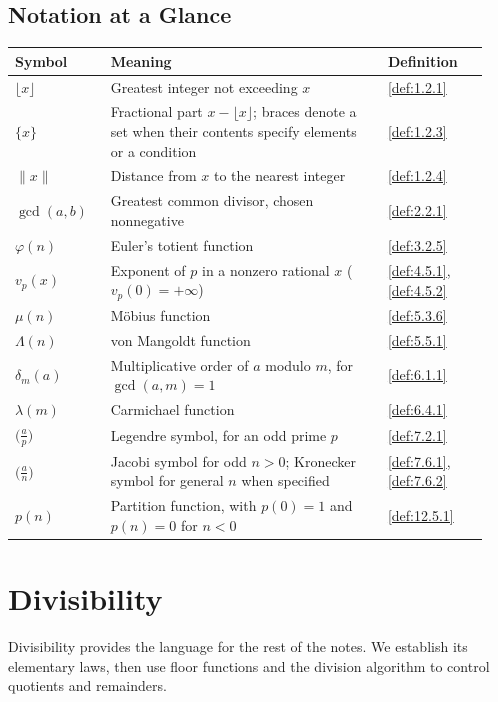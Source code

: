 \documentclass[11pt]{article}
\theoremstyle{ntstyle}
\newcommand{\legs}[2]{\bigl(\tfrac{#1}{#2}\bigr)}
\begin{document}
\subsection*{Notation at a Glance}
\begin{center}
\begin{tabular}{@{}p{0.19\linewidth}p{0.55\linewidth}p{0.20\linewidth}@{}}
\textbf{Symbol} & \textbf{Meaning} & \textbf{Definition} \\
\hline
$\lfloor x\rfloor$ & Greatest integer not exceeding $x$ & \ref{def:1.2.1} \\
$\{x\}$ & Fractional part $x-\lfloor x\rfloor$; braces denote a set when their contents specify elements or a condition & \ref{def:1.2.3} \\
$\lVert x\rVert$ & Distance from $x$ to the nearest integer & \ref{def:1.2.4} \\
$\gcd(a,b)$ & Greatest common divisor, chosen nonnegative & \ref{def:2.2.1} \\
$\varphi(n)$ & Euler's totient function & \ref{def:3.2.5} \\
$v_p(x)$ & Exponent of $p$ in a nonzero rational $x$ ($v_p(0)=+\infty$) & \ref{def:4.5.1}, \ref{def:4.5.2} \\
$\mu(n)$ & M{\"o}bius function & \ref{def:5.3.6} \\
$\Lambda(n)$ & von Mangoldt function & \ref{def:5.5.1} \\
$\delta_m(a)$ & Multiplicative order of $a$ modulo $m$, for $\gcd(a,m)=1$ & \ref{def:6.1.1} \\
$\lambda(m)$ & Carmichael function & \ref{def:6.4.1} \\
$\legs{a}{p}$ & Legendre symbol, for an odd prime $p$ & \ref{def:7.2.1} \\
$\legs{a}{n}$ & Jacobi symbol for odd $n>0$; Kronecker symbol for general $n$ when specified & \ref{def:7.6.1}, \ref{def:7.6.2} \\
$p(n)$ & Partition function, with $p(0)=1$ and $p(n)=0$ for $n<0$ & \ref{def:12.5.1} \\
\end{tabular}
\end{center}

\clearpage

\section{Divisibility}

Divisibility provides the language for the rest of the notes. We establish its elementary laws, then use floor
functions and the division algorithm to control quotients and remainders.
\end{document}
